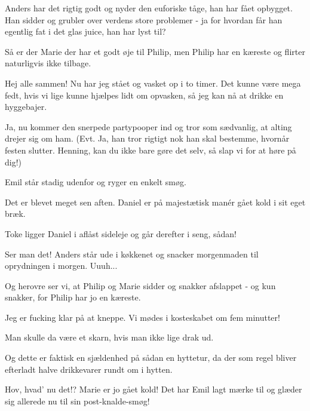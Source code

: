 \documentclass[a4paper,11pt]{article}
\begin{document}
\begin{sketch}

 Anders har det rigtig godt og nyder den euforiske tåge, han har fået opbygget. Han sidder og grubler over verdens store problemer - ja for hvordan får han egentlig fat i det glas juice, han har lyst til?

 Så er der Marie der har et godt øje til Philip, men Philip har en kæreste og flirter naturligvis ikke tilbage.



 Hej alle sammen! Nu har jeg stået og vasket op i to timer. Det kunne være mega fedt, hvis vi lige kunne hjælpes lidt om opvasken, så jeg kan nå at drikke en hyggebajer.

 Ja, nu kommer den snerpede partypooper ind og tror som sædvanlig, at alting drejer sig om ham. (Evt. Ja, han tror rigtigt nok han skal bestemme, hvornår festen slutter. Henning, kan du ikke bare gøre det selv, så slap vi for at høre på dig!)


 Emil står stadig udenfor og ryger en enkelt smøg.



 Det er blevet meget sen aften. Daniel er på majestætisk manér gået kold i sit eget bræk.

 Toke ligger Daniel i aflåst sideleje og går derefter i seng, sådan!

 Ser man det! Anders står ude i køkkenet og snacker morgenmaden til oprydningen i morgen. Uuuh...

 Og herovre ser vi, at Philip og Marie sidder og snakker afslappet - og kun snakker, for Philip har jo en kæreste.


 Jeg er fucking klar på at kneppe. Vi mødes i kosteskabet om fem minutter!


 Man skulle da være et skarn, hvis man ikke lige drak ud.


 Og dette er faktisk en sjældenhed på sådan en hyttetur, da der som regel bliver efterladt halve drikkevarer rundt om i hytten. 


 Hov, hvad' nu det!? Marie er jo gået kold! Det har Emil lagt mærke til og glæder sig allerede nu til sin post-knalde-smøg!


\end{sketch}
\end{document}
